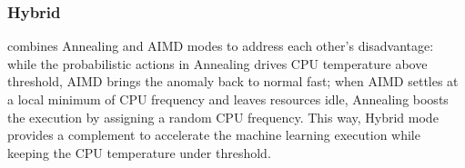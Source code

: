 \subsubsection{Hybrid} combines Annealing and AIMD modes to address each other's disadvantage: while the probabilistic actions in Annealing drives CPU temperature above threshold, AIMD brings the anomaly back to normal fast; when AIMD settles at a local minimum of CPU frequency and leaves resources idle, Annealing boosts the execution by assigning a random CPU frequency. This way, Hybrid mode provides a complement to accelerate the machine learning execution while keeping the CPU temperature under threshold. 
